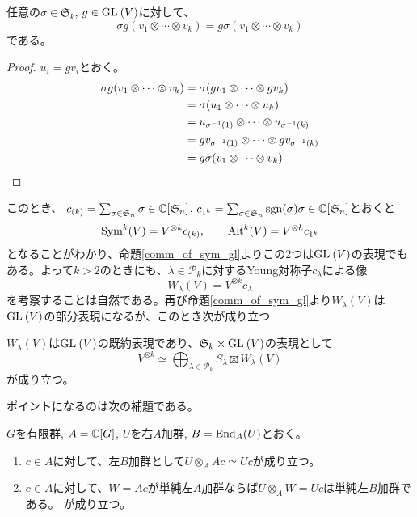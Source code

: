 \documentclass{ltjsreport}
\begin{document}
\begin{prop}\label{comm_of_sym_gl}
  任意の$\sigma\in\mathfrak{S}_k$, $g\in\text{GL}\:(V)$に対して、
  \[
  \sigma g(v_1\otimes\cdots\otimes v_k)
  =
  g \sigma(v_1\otimes\cdots\otimes v_k)
  \]
  である。
\end{prop}

\begin{proof}
  $u_i=gv_i$とおく。
  \begin{align*}
    \sigma g(v_1\otimes\cdots\otimes v_k)
    &=\sigma(gv_1\otimes\cdots\otimes gv_k)\\
    &=\sigma(u_1\otimes\cdots\otimes u_k)\\
    &=u_{\sigma^{-1}(1)}\otimes\cdots\otimes u_{\sigma^{-1}(k)}\\
    &=gv_{\sigma^{-1}(1)}\otimes\cdots\otimes gv_{\sigma^{-1}(k)}\\
    &=g\sigma (v_1\otimes\cdots\otimes v_k)
  \end{align*}
\end{proof}

このとき、
$c_{(k)}=\sum_{\sigma\in \mathfrak{S}_n}\sigma\in\mathbb{C}[\mathfrak{S}_n]$, $c_{1^k}=\sum_{\sigma\in \mathfrak{S}_n}\mathrm{sgn}(\sigma)\sigma\in\mathbb{C}[\mathfrak{S}_n]$とおくと
\[
\text{Sym}^k(V)=V^{\otimes k}c_{(k)},\qquad\text{Alt}^k(V)=V^{\otimes k}c_{1^k}
\]
となることがわかり、命題\ref{comm_of_sym_gl}よりこの2つは$\text{GL}\:(V)$の表現でもある。よって$k>2$のときにも、$\lambda\in\mathcal{P}_k$に対するYoung対称子$c_\lambda$による像
\[
W_\lambda(V)=V^{\otimes k}c_\lambda   
\]
を考察することは自然である。再び命題\ref{comm_of_sym_gl}より$W_\lambda(V)$は$\text{GL}\:(V)$の部分表現になるが、このとき次が成り立つ

\begin{theo}\label{schur_weyl}
  $W_\lambda(V)$は$\text{GL}\:(V)$の既約表現であり、$\mathfrak{S}_k\times\text{GL}\:(V)$の表現として
  \[
  V^{\otimes k}\simeq \bigoplus_{\lambda\in\mathcal{P}_k}S_\lambda\boxtimes W_\lambda(V)  
  \]
  が成り立つ。
\end{theo}


ポイントになるのは次の補題である。

\begin{lemm}\label{DCT}
  $G$を有限群, $A=\mathbb{C}[G]$, $U$を右$A$加群, $B=\text{End}_A(U)$とおく。
  \begin{enumerate}
    \item $c\in A$に対して、左$B$加群として$U\otimes_AAc\simeq Uc$が成り立つ。
    \item $c\in A$に対して、$W=Ac$が単純左$A$加群ならば$U\otimes_AW=Uc$は単純左$B$加群である。
    が成り立つ。
  \end{enumerate}
\end{lemm}
\end{document}
